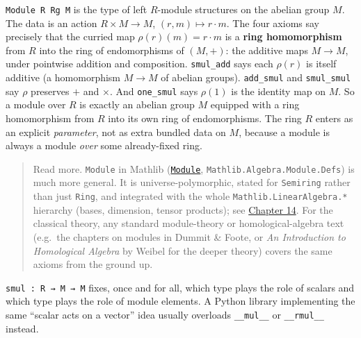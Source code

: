 \begin{mathreading}

\texttt{Module R Rg M} is the type of left \(R\)-module structures on the abelian group \(M\). The data is an action \(R \times M \to
M\), \((r,m)\mapsto r\cdot m\). The four axioms say precisely that the curried map \(\rho(r)(m) = r\cdot m\) is a \textbf{ring homomorphism} from \(R\) into the ring of endomorphisms of \((M,+)\): the additive maps \(M \to M\), under pointwise addition and composition. \texttt{smul\_\allowbreak{}add} says each \(\rho(r)\) is itself additive (a homomorphism \(M \to M\) of abelian groups). \texttt{add\_\allowbreak{}smul} and \texttt{smul\_\allowbreak{}smul} say \(\rho\) preserves \(+\) and \(\times\). And \texttt{one\_\allowbreak{}smul} says \(\rho(1)\) is the identity map on \(M\). So a module over \(R\) is exactly an abelian group \(M\) equipped with a ring homomorphism from \(R\) into its own ring of endomorphisms. The ring \(R\) enters as an explicit \emph{parameter}, not as extra bundled data on \(M\), because a module is always a module \emph{over} some already-fixed ring.

\end{mathreading}

\begin{quote}
Read more. \texttt{Module} in Mathlib (\href{https://loogle.lean-lang.org/?q=Module}{\texttt{Module}}, \texttt{Mathlib.Algebra.Module.Defs}) is much more general. It is universe-polymorphic, stated for \texttt{Semiring} rather than just \texttt{Ring}, and integrated with the whole \texttt{Mathlib.LinearAlgebra.*} hierarchy (bases, dimension, tensor products); see \hyperref[sec:14-next-steps:02-moving-to-mathlib:1]{Chapter 14}. For the classical theory, any standard module-theory or homological-algebra text (e.g.~the chapters on modules in Dummit \& Foote, or \emph{An Introduction to Homological Algebra} by Weibel for the deeper theory) covers the same axioms from the ground up.
\end{quote}

\begin{progcorner}

\texttt{smul : R → M → M} fixes, once and for all, which type plays the role of scalars and which type plays the role of module elements. A Python library implementing the same ``scalar acts on a vector'' idea usually overloads \texttt{\_\allowbreak{}\_\allowbreak{}mul\_\allowbreak{}\_\allowbreak{}} or \texttt{\_\allowbreak{}\_\allowbreak{}rmul\_\allowbreak{}\_\allowbreak{}} instead.

\end{progcorner}

